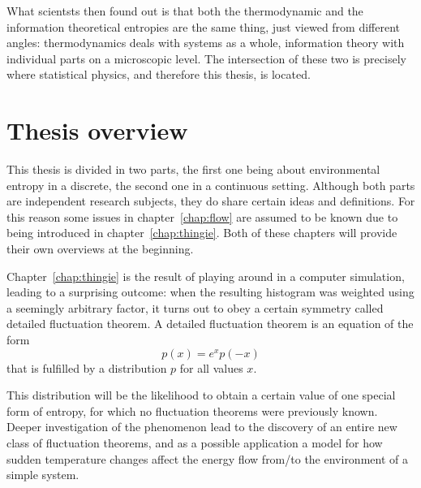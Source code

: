 What scientsts then found out is that both the thermodynamic and the information theoretical entropies are the same thing, just viewed from different angles: thermodynamics deals with systems as a whole, information theory with individual parts on a microscopic level. The intersection of these two is precisely where statistical physics, and therefore this thesis, is located.



\section{Thesis overview}

This thesis is divided in two parts, the first one being about environmental entropy in a discrete, the second one in a continuous setting. Although both parts are independent research subjects, they do share certain ideas and definitions. For this reason some issues in chapter~\ref{chap:flow} are assumed to be known due to being introduced in chapter~\ref{chap:thingie}. Both of these chapters will provide their own overviews at the beginning.


Chapter~\ref{chap:thingie} is the result of playing around in a computer simulation, leading to a surprising outcome: when the resulting histogram was weighted using a seemingly arbitrary factor, it turns out to obey a certain symmetry called detailed fluctuation theorem. A detailed fluctuation theorem is an equation of the form
%
\begin{equation}
	p(x) = e^{x}p(-x)
\end{equation}
%
that is fulfilled by a distribution \(p\) for all values \(x\).

This distribution will be the likelihood to obtain a certain value of one special form of entropy, for which no fluctuation theorems were previously known. Deeper investigation of the phenomenon lead to the discovery of an entire new class of fluctuation theorems, and as a possible application a model for how sudden temperature changes affect the energy flow from/to the environment of a simple system.





